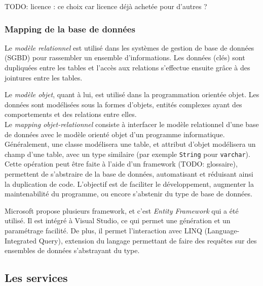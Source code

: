 TODO: licence : ce choix car licence déjà achetée pour d'autres ?


\subsubsection{Mapping de la base de données}

Le \textit{modèle relationnel} est utilisé dans les systèmes de gestion de base de données (SGBD) pour rassembler un ensemble d'informations. Les données (clés) sont dupliquées entre les tables et l'accès aux relations s'effectue ensuite grâce à des jointures entre les tables.

Le \textit{modèle objet}, quant à lui, est utilisé dans la programmation orientée objet. Les données sont modélisées sous la formes d'objets, entités complexes ayant des comportements et des relations entre elles.
\\

Le \textit{mapping objet-relationnel} consiste à interfacer le modèle relationnel d'une base de données avec le modèle orienté objet d'un programme informatique. Généralement, une classe modélisera une table, et attribut d'objet modélisera un champ d'une table, avec un type similaire (par exemple \lstinline{String} pour \lstinline{varchar}).
\\

Cette opération peut être faite à l'aide d'un framework (TODO: glossaire), permettent de s'abstraire de la base de données, automatisant et réduisant ainsi la duplication de code. L'objectif est de faciliter le développement, augmenter la maintenabilité du programme, ou encore s'abstenir du type de base de données.

Microsoft propose plusieurs framework, et c'est \textit{Entity Framework} qui a été utilisé. Il est intégré à Visual Studio, ce qui permet une génération et un paramétrage facilité. De plus, il permet l'interaction avec  LINQ (Language-Integrated Query), extension du langage permettant de faire des requêtes sur des ensembles de données s'abstrayant du type.


\subsection{Les services}

